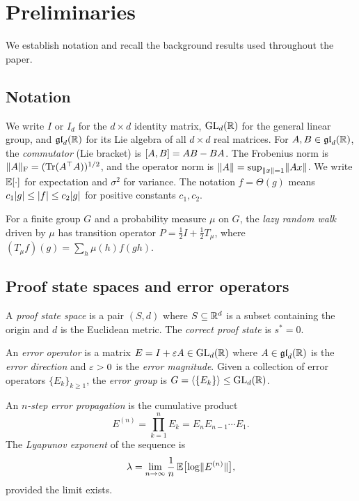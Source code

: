 \section{Preliminaries}\label{sec:prelim}

We establish notation and recall the background results used throughout
the paper.

\subsection{Notation}\label{ssec:notation}

We write $I$ or $I_d$ for the $d \times d$ identity matrix,
$\operatorname{GL}_d(\mathbb{R})$ for the general linear group, and $\operatorname{\mathfrak{gl}}_d(\mathbb{R})$ for its Lie
algebra of all $d \times d$ real matrices.  For $A, B \in \operatorname{\mathfrak{gl}}_d(\mathbb{R})$,
the \emph{commutator} (Lie bracket) is $[A, B] = AB - BA$.  The
Frobenius norm is $\lVert A \rVert_{\mathrm{F}} = (\operatorname{Tr}(A^\top A))^{1/2}$, and the
operator norm is $\lVert A \rVert = \sup_{\lVert x \rVert=1} \lVert Ax \rVert$.  We
write $\mathbb{E}[\cdot]$ for expectation and $\sigma^2$ for variance.  The
notation $f = \Theta(g)$ means $c_1 \lvert g \rvert \le \lvert f \rvert \le c_2 \lvert g \rvert$
for positive constants $c_1, c_2$.

For a finite group $G$ and a probability measure $\mu$ on $G$, the
\emph{lazy random walk} driven by $\mu$ has transition operator
$P = \tfrac{1}{2} I + \tfrac{1}{2} T_\mu$, where $(T_\mu f)(g)
= \sum_{h} \mu(h) f(gh)$.

\subsection{Proof state spaces and error operators}

\begin{definition}\label{def:proof_state}
A \emph{proof state space} is a pair $(S, d)$ where $S \subseteq \mathbb{R}^d$
is a subset containing the origin and $d$ is the Euclidean metric.
The \emph{correct proof state} is $s^* = 0$.
\end{definition}

\begin{definition}\label{def:error_op}
An \emph{error operator} is a matrix $E = I + \varepsilon A \in \operatorname{GL}_d(\mathbb{R})$
where $A \in \operatorname{\mathfrak{gl}}_d(\mathbb{R})$ is the \emph{error direction} and $\varepsilon > 0$
is the \emph{error magnitude}.  Given a collection of error operators
$\{E_k\}_{k \ge 1}$, the \emph{error group} is
$G = \langle \{E_k\} \rangle \le \operatorname{GL}_d(\mathbb{R})$.
\end{definition}

\begin{definition}\label{def:error_prop}
An \emph{$n$-step error propagation} is the cumulative product
\[
  E^{(n)} = \prod_{k=1}^{n} E_k = E_n E_{n-1} \cdots E_1.
\]
The \emph{Lyapunov exponent} of the sequence is
\[
  \lambda = \lim_{n \to \infty} \frac{1}{n}\, \mathbb{E}\bigl[\log \lVert E^{(n)} \rVert\bigr],
\]
provided the limit exists.
\end{definition}

